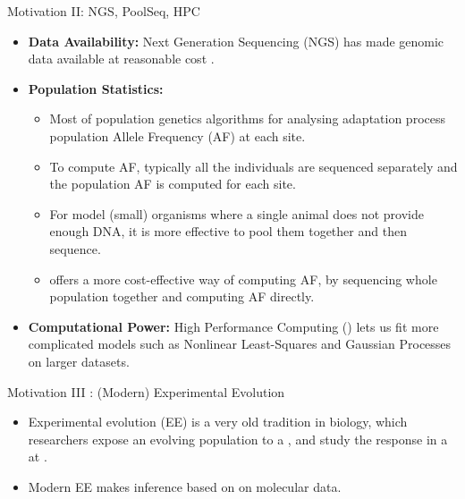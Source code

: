 \documentclass[t]{beamer} %
\begin{document}
\begin{frame}{Motivation II: NGS, PoolSeq, HPC}
\begin{itemize}
\item {\bf Data Availability:} Next Generation Sequencing (NGS) has made genomic data available at reasonable cost .
\pause
\item {\bf Population Statistics:} 
\begin{itemize}
\item Most of population genetics algorithms for analysing adaptation process population Allele Frequency (AF) at each site.
\item To compute AF, typically all the individuals are sequenced separately and the population AF is computed for each site.
\item For model (small) organisms where a single animal does not provide enough DNA, it is more effective to pool them together and then sequence.
\item {} offers a more cost-effective way of computing AF, by sequencing whole population together and computing AF directly. 
\end{itemize}
\pause
\item {\bf Computational Power:} High Performance Computing () lets us fit more complicated models such as Nonlinear Least-Squares and Gaussian Processes on larger datasets.
\end{itemize}
\end{frame}

\begin{frame}{Motivation III : (Modern) Experimental Evolution}
\begin{itemize}
\item  Experimental evolution (EE) is a very old tradition in biology, which researchers expose an evolving population to a , and study the response in a  at .
\item Modern EE makes inference based on on molecular data.
\end{itemize}
\end{frame}
\end{document}
